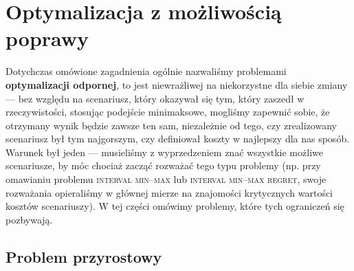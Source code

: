 \section{Optymalizacja z możliwością poprawy}

Dotychczas omówione zagadnienia ogólnie nazwaliśmy problemami \textbf{optymalizacji odpornej}, to jest niewrażliwej na niekorzystne dla siebie zmiany --- bez względu na scenariusz, który okazywał się tym, który zaszedł w rzeczywistości, stosując podejście minimaksowe, mogliśmy zapewnić sobie, że otrzymany wynik będzie zawsze ten sam, niezależnie od tego, czy zrealizowany scenariusz był tym najgorszym, czy definiował koszty w najlepszy dla nas sposób. Warunek był jeden --- musieliśmy z wyprzedzeniem znać wszystkie możliwe scenariusze, by móc chociaż zacząć rozważać tego typu problemy (np. przy omawianiu problemu \textsc{interval min--max} lub \textsc{interval min--max regret}, swoje rozważania opieraliśmy w głównej mierze na znajomości krytycznych wartości kosztów scenariuszy). W tej części omówimy problemy, które tych ograniczeń się pozbywają.

\subsection{Problem przyrostowy}

